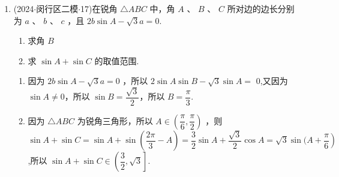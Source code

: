 \begin{enumerate}
\begin{jieda}
\begin{enumerate}
            \item ${S}_{\bigtriangleup {ABC}} = \dfrac{1}{2}{ac}\sin B = \sqrt{3}$ ，所以 ${ac} = 4$ ，由余弦定理 ${b}^{2} =  {a}^{2} + {c}^{2} - {2ac}\cos B = 4$ ,得 ${a}^{2} + {c}^{2} = 8$ ,即 $\dfrac{16}{{c}^{2}} + {c}^{2} = 8$ ,解得 $c =  2,a = 2$ ,所以 $\bigtriangleup {ABC}$ 是等边三角形.
        \end{enumerate}
    \end{jieda}

    \item (2024$\cdot$闵行区二模$\cdot$17)在锐角 $\bigtriangleup  {ABC}$ 中，角 $A$ 、 $B$ 、 $C$ 所对边的边长分别为 $a$ 、 $b$ 、 $c$ ，且 ${2b}\sin A -  \sqrt{3}a = 0.$
    \begin{enumerate}
        \item 求角 $B$
        \item 求 $\sin A + \sin C$ 的取值范围.
    \end{enumerate}
    \begin{jieda}
        \begin{enumerate}
            \item 因为 ${2b}\sin A - \sqrt{3}a = 0$ ，所以 $2\sin A\sin B - \sqrt{3}\sin A =$ 0,又因为 $\sin A \neq  0$，所以 $\sin B = \dfrac{\sqrt{3}}{2}$，所以 $B = \dfrac{\pi }{3}$.

            \item 因为 $\bigtriangleup  {ABC}$ 为锐角三角形，所以 $A \in  \left( {\dfrac{\pi }{6},\dfrac{\pi }{2}}\right)$ ，则 $\sin A +  \sin C = \sin A + \sin \left( {\dfrac{2\pi }{3} - A}\right)  = \dfrac{3}{2}\sin A + \dfrac{\sqrt{3}}{2}\cos A = \sqrt{3}\sin (A +  \left. \dfrac{\pi }{6}\right)$ ,所以 $\sin A + \sin C \in  \left( {\dfrac{3}{2},\sqrt{3}}\right\rbrack$.
        \end{enumerate}
    \end{jieda}


\end{enumerate}
